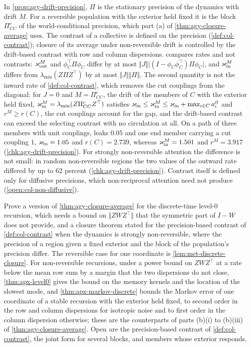In \cref{prop:agy-drift-precision}, $\Pi$ is the stationary precision of the dynamics with drift $M$. For a reversible population with the exterior held fixed it is the block $\Pi^c_{CC}$ of the world-conditional precision, which part (a) of \cref{thm:agy-closure-average} uses. The contrast of a collective is defined on the precision (\cref{def:col-contrast}); closure of its average under non-reversible drift is controlled by the drift-based contrast with row and column dispersions.  compares rates and not contrasts: $\varkappa_{\mathrm{out}}^M$ and $\phi_C^\top\Pi\phi_C$ differ by at most $\Vert J\Vert\lvert(I-\phi_C\phi_C^\top)\Pi\phi_C\rvert$, and $\varkappa_{\mathrm{in}}^M$ differs from $\lambda_{\min}(Z\Pi Z^\top)$ by at most $\Vert J\Vert\Vert\Pi\Vert$. The second quantity is not the inward rate of \cref{def:col-contrast}, which removes the cut couplings from the diagonal: for $J=0$ and $M=\Pi^c_{CC}$, the drift of the members of $C$ with the exterior held fixed, $\varkappa_{\mathrm{in}}^M=\lambda_{\min}(Z\Pi^c_{CC}Z^\top)$ satisfies $\varkappa_{\mathrm{in}}\le\varkappa_{\mathrm{in}}^M\le\varkappa_{\mathrm{in}}+\max_{i\in C}a^\partial_i$ and $r^M\ge r(C)$, the cut couplings account for the gap, and the drift-based contrast can exceed the selecting contrast with no circulation at all. On a path of three members with unit couplings, leaks $0.05$ and one end member carrying a cut coupling $1$, $\varkappa_{\mathrm{in}}=1.05$ and $r(C)=2.739$, whereas $\varkappa_{\mathrm{in}}^M=1.501$ and $r^M=3.917$ (\cref{chk:agy-drift-precision}). For strongly non-reversible attention the difference is not small: in random non-reversible regions the two values of the outward rate differed by up to 62 percent (\cref{chk:agy-drift-precision}). Contrast itself is defined only for diffusive precisions, which non-reciprocal attention need not produce (\cref{open:col-non-diffusive}).

\begin{openproblem}\label{open:agy-discrete-closure}
Prove a version of \cref{thm:agy-closure-average} for the discrete-time level-0 recursion, which needs a bound on $\Vert ZWZ^\top\Vert$ that the symmetric part of $I-W$ does not provide, and a closure theorem stated for the precision-based contrast of \cref{def:col-contrast} when the dynamics is strongly non-reversible, where the precision of a region given a fixed exterior and the block of the population's precision differ. The reversible case for one coordinate is \cref{lem:met-discrete-closure}. For non-reversible recursions, under a power bound on $ZWZ^\top$ at a rate below the mean row sum by a margin that the two dispersions do not close, \cref{thm:apx-level0} gives the bound on the memory kernels and the location of the slowest mode, and \cref{thm:apx-markov-discrete} bounds the Markov error of one coordinate of a stable recursion with the exterior held fixed, to second order in the row and column dispersions for isotropic noise and to first order in the column dispersion otherwise; these are the counterparts of parts (b)(i) to (b)(iii) of \cref{thm:agy-closure-average}. Open are the precision-based contrast of \cref{def:col-contrast}, the joint form for several blocks, and members whose exterior responds.
\end{openproblem}

